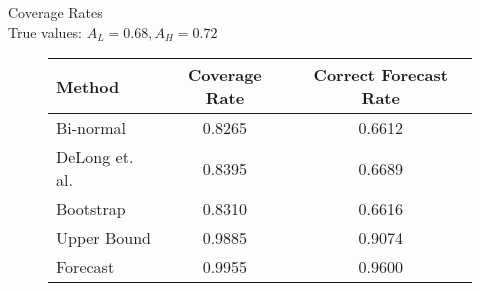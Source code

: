 

Coverage Rates \\
True values: $A_L = 0.68, A_H = 0.72$

\begin{figure}[h!]

\begin{center}


    \begin{tabular}{l c c }

    Method & Coverage Rate & Correct Forecast Rate \\

    \hline



          Bi-normal &  0.8265 & 0.6612 \\
     DeLong et. al. &  0.8395 & 0.6689 \\
          Bootstrap &  0.8310 & 0.6616 \\
        Upper Bound &  0.9885 & 0.9074 \\
           Forecast &  0.9955 & 0.9600 \\


    \hline

    \end{tabular}


\end{center}

%





\end{figure}



